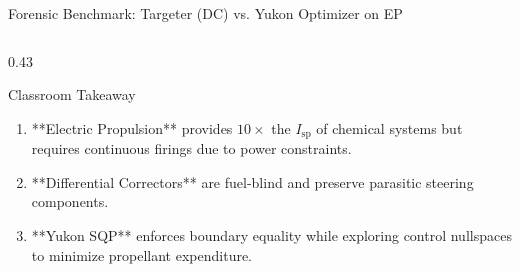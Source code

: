 \documentclass[aspectratio=169, 10pt]{beamer}
\begin{document}
\begin{frame}{Forensic Benchmark: Targeter (DC) vs. Yukon Optimizer on EP}
\begin{columns}[T]
        \begin{column}{0.43\textwidth}
            \begin{exampleblock}{Classroom Takeaway}
                \scriptsize
                \begin{enumerate}\setlength{\itemsep}{2pt}\setlength{\topsep}{0pt}
                    \item **Electric Propulsion** provides $10\times$ the $I_{\text{sp}}$ of chemical systems but requires continuous firings due to power constraints.
                    \item **Differential Correctors** are fuel-blind and preserve parasitic steering components.
                    \item **Yukon SQP** enforces boundary equality while exploring control nullspaces to minimize propellant expenditure.
                \end{enumerate}
            \end{exampleblock}
        \end{column}
    \end{columns}
\end{frame}
\end{document}
